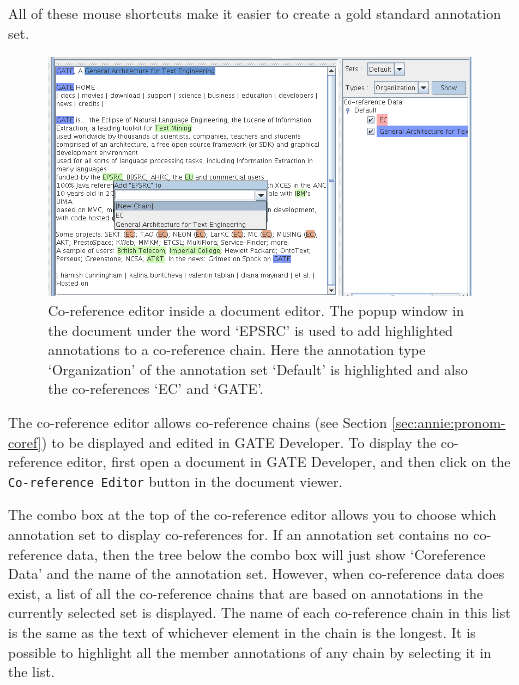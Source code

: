 All of these mouse shortcuts make it easier to create a gold standard
annotation set.


\begin{figure}[htb]
\begin{center}
\includegraphics[scale=0.5]{co-reference-editor.png}
\end{center}
\caption{Co-reference editor inside a document editor. The popup window in
the document under the word `EPSRC' is used to add highlighted annotations
to a co-reference chain. Here the annotation type `Organization' of the
annotation set `Default' is highlighted and also the co-references `EC' and
`GATE'.}
\label{fig:coreferenceeditor}
\end{figure}

The co-reference editor allows co-reference chains (see Section 
\ref{sec:annie:pronom-coref}) to be displayed and edited in GATE Developer.
To display the co-reference editor, first open a document in GATE
Developer, and then click on the {\tt Co-reference Editor} button in
the document viewer.

The combo box at the top of the co-reference editor allows you to choose which 
annotation set to display co-references for. If an annotation set contains no
co-reference data, then the tree below the combo box will just show `Coreference
Data' and the name of the annotation set. However, when co-reference data does 
exist, a list of all the co-reference chains that are based on annotations in 
the currently selected set is displayed. The name of each co-reference chain in
this list is the same as the text of whichever element in the chain is the 
longest. It is possible to highlight all the 
member annotations of any chain by selecting it in the list.


